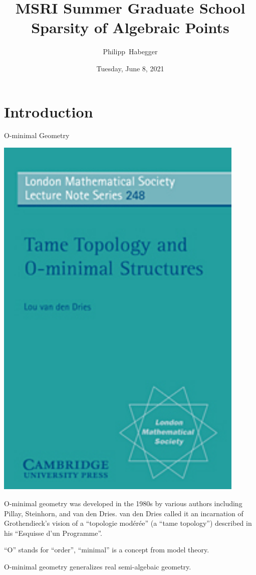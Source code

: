 \documentclass{beamer}
\title{MSRI Summer Graduate School \\ Sparsity of Algebraic Points}
\author{Philipp~Habegger}
\date{Tuesday, June 8, 2021}
\begin{document}
\setlength{\abovecaptionskip}{0pt} 
\setlength{\belowcaptionskip}{0pt} 

\renewcommand{\figurename}{Fig.}


\begin{frame}
  \titlepage
\end{frame}

\section{Introduction}
\begin{frame}{O-minimal Geometry}
  \begin{minipage}{0.3\linewidth}
    \includegraphics[width=0.9\textwidth]{vddries_title.jpg}    
  \end{minipage}\begin{minipage}{0.6\linewidth}
    O-minimal geometry was developed in the 1980s by various authors
    including Pillay, Steinhorn, and van den Dries. van den Dries called it an
    incarnation of Grothendieck's vision of a ``topologie
    mod\'er\'ee'' (a ``tame topology'') described
    in his ``Esquisse d'un Programme''.  
  \end{minipage}

  ``O'' stands for ``order'',  ``minimal'' is a concept from model
  theory.

  O-minimal geometry generalizes real semi-algebaic geometry. 
\end{frame}
\end{document}
